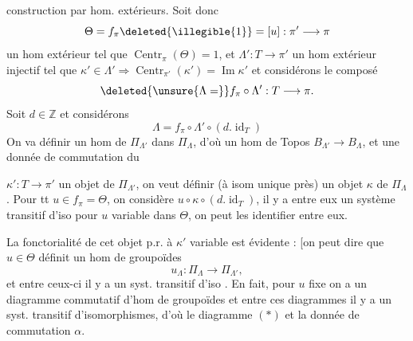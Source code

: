 construction par hom. extérieurs. Soit donc
\[
\Theta=f_\pi\deleted{\illegible{1}}=[u]:\pi'\longrightarrow\pi
\]
un hom extérieur tel que \(\operatorname{Centr}_\pi(\Theta)=1\),
et \(\Lambda':T\longrightarrow\pi'\) un hom extérieur injectif
tel que \(\kappa'\in\Lambda'\Rightarrow\operatorname{Centr}_{\pi'}(\kappa')=\operatorname{Im}\kappa'\)
et considérons le composé
\[
\deleted{\unsure{\Lambda=}}f_\pi\circ\Lambda':T\longrightarrow\pi.
\]
Soit \(d\in\mathbb Z\) et considérons
\[
\Lambda=f_\pi\circ\Lambda'\circ(d.\operatorname{id}_T)
\]
On va définir un hom de \(\Pi_{\Lambda'}\) dans \(\Pi_\Lambda\),
d'où un hom de Topos \(B_{\Lambda'}\longrightarrow B_\Lambda\),
et une donnée de commutation \inserted{\(\alpha\)} du

 \(\kappa':T\longrightarrow\pi'\) un objet de \(\Pi_{\Lambda'}\),
on veut définir (à isom unique près) un
objet \(\kappa\) de \(\Pi_\Lambda\). Pour tt \(u\in f_\pi=\Theta\),
on considère \(u\circ\kappa\circ(d.\operatorname{id}_T)\), il y a entre eux
un système transitif d'iso pour \(u\) variable
dans \(\Theta\), on peut les identifier entre eux.

La fonctorialité de cet objet p.r. à
\(\kappa'\) variable est évidente : [on peut dire que
\(u\in\Theta\) définit un hom de groupoïdes
\[
u_\Lambda:\Pi_\Lambda\longrightarrow\Pi_{\Lambda'},
\]
et entre ceux-ci
il y a un syst. transitif d'iso \unsure{\}}. En fait,
pour \(u\) fixe on a un  diagramme
commutatif d'hom de groupoïdes
et entre ces diagrammes il y a un
syst. transitif d'isomorphismes, d'où
le diagramme \((*)\) et la donnée
de commutation \(\alpha\).


